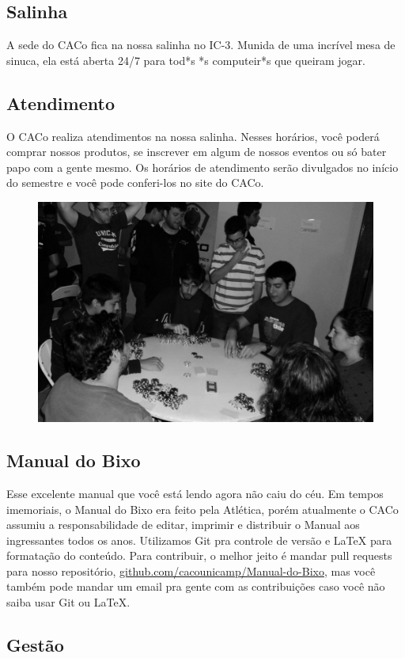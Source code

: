\subsection{Salinha}

A sede do CACo fica na nossa salinha no IC-3. Munida de uma incrível mesa de
sinuca, ela está aberta 24/7 para tod*s *s computeir*s que queiram jogar.

\subsection{Atendimento}

O CACo realiza atendimentos na nossa salinha. Nesses horários, você poderá
comprar nossos produtos, se inscrever em algum de nossos eventos ou só bater
papo com a gente mesmo. Os horários de atendimento serão divulgados no início do
semestre e você pode conferi-los no site do CACo.

\begin{figure}[H]
    \centering
    \includegraphics[width=.45\textwidth]{img/alem_da_graduacao/caco_poker1.jpg}
\end{figure}

\subsection{Manual do Bixo}

Esse excelente manual que você está lendo agora não caiu do céu. Em tempos
imemoriais, o Manual do Bixo era feito pela Atlética, porém atualmente o CACo
assumiu a responsabilidade de editar, imprimir e distribuir o Manual aos
ingressantes todos os anos. Utilizamos Git pra controle de versão e {\LaTeX }
para formatação do conteúdo. Para contribuir, o melhor jeito é mandar pull
requests para nosso repositório, \url{github.com/cacounicamp/Manual-do-Bixo},
mas você também pode mandar um email pra gente com as contribuições caso você
não saiba usar Git ou \LaTeX.

\subsection{Gestão}

